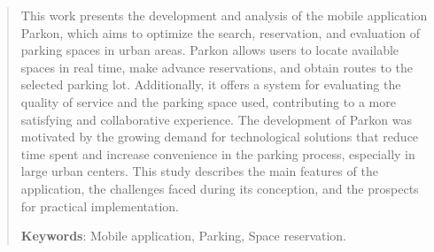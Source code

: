 \begin{abstract}

This work presents the development and analysis of the mobile application Parkon, which aims to optimize the search, reservation, and evaluation of parking spaces in urban areas. Parkon allows users to locate available spaces in real time, make advance reservations, and obtain routes to the selected parking lot. Additionally, it offers a system for evaluating the quality of service and the parking space used, contributing to a more satisfying and collaborative experience. The development of Parkon was motivated by the growing demand for technological solutions that reduce time spent and increase convenience in the parking process, especially in large urban centers. This study describes the main features of the application, the challenges faced during its conception, and the prospects for practical implementation.

{\hspace{-8mm} \bf{Keywords}}: Mobile application, Parking, Space reservation.

\end{abstract}


\listoffigures

